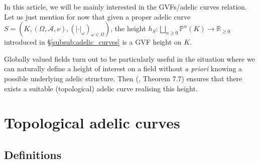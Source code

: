 \documentclass [11pt,reqno]{amsart}
\def\bR{{\mathbb{R}}}
\newcommand{\1}{\mathmybb{1}}
\def\cA{{\mathcal{A}}}
\newcommand{\va}{|\cdot|}
\begin{document}
In this article, we will be mainly interested in the GVFs/adelic curves relation. Let us just mention for now that given a proper adelic curve $S=(K,(\Omega,\cA,\nu),(\va_{\omega})_{\omega\in \Omega})$, the height $h_{S}: \bigsqcup_{n\geq 0}\mathbb{P}^{n}(K)\to \bR_{\geq 0}$ introduced in \S \ref{subsub:adelic_curves} is a GVF height on $K$. 

Globally valued fields turn out to be particularly useful in the situation where we can naturally define a height of interest on a field without \emph{a priori} knowing a possible underlying adelic structure. Then (\cite{GVF24}, Theorem 7.7) ensures that there exists a suitable (topological) adelic curve realising this height.

\section{Topological adelic curves}
\label{sec:topological_adelic_curves}

\subsection{Definitions}
\end{document}
